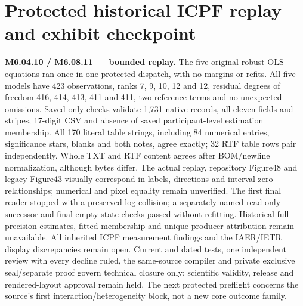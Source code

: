 \documentclass[11pt,a4paper]{article}
\begin{document}
\section*{Protected historical ICPF replay and exhibit checkpoint}
\noindent\textbf{M6.04.10 / M6.08.11 — bounded replay.} The five original robust-OLS equations ran once in one protected dispatch, with no margins or refits. All five models have 423 observations, ranks 7, 9, 10, 12 and 12, residual degrees of freedom 416, 414, 413, 411 and 411, two reference terms and no unexpected omissions. Saved-only checks validate 1,731 native records, all eleven fields and stripes, 17-digit CSV and absence of saved participant-level estimation membership. All 170 literal table strings, including 84 numerical entries, significance stars, blanks and both notes, agree exactly; 32 RTF table rows pair independently. Whole TXT and RTF content agrees after BOM/newline normalization, although bytes differ. The actual replay, repository Figure48 and legacy Figure43 visually correspond in labels, directions and interval-zero relationships; numerical and pixel equality remain unverified. The first final reader stopped with a preserved log collision; a separately named read-only successor and final empty-state checks passed without refitting. Historical full-precision estimates, fitted membership and unique producer attribution remain unavailable. All inherited ICPF measurement findings and the IAER/IETR display discrepancies remain open. Current and dated tests, one independent review with every decline ruled, the same-source compiler and private exclusive seal/separate proof govern technical closure only; scientific validity, release and rendered-layout approval remain held. The next protected preflight concerns the source's first interaction/heterogeneity block, not a new core outcome family.
\end{document}
